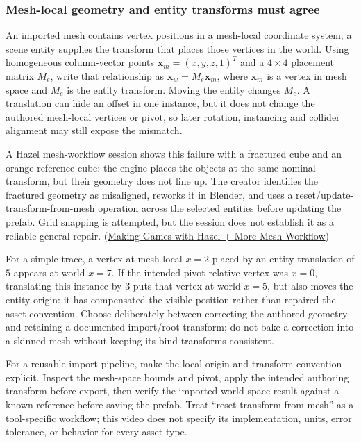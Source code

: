 \subsubsection{Mesh-local geometry and entity transforms must agree}\label{06-engine-ii-ch032-mesh-local-geometry-and-entity-transforms-must-agree}

An imported mesh contains vertex positions in a mesh-local coordinate system; a scene entity supplies the transform that places those vertices in the world. Using homogeneous column-vector points \(\mathbf{x}_m=(x,y,z,1)^T\) and a \(4\times4\) placement matrix \(M_e\), write that relationship as \(\mathbf{x}_w = M_e\mathbf{x}_m\), where \(\mathbf{x}_m\) is a vertex in mesh space and \(M_e\) is the entity transform. Moving the entity changes \(M_e\). A translation can hide an offset in one instance, but it does not change the authored mesh-local vertices or pivot, so later rotation, instancing and collider alignment may still expose the mismatch.

A Hazel mesh-workflow session shows this failure with a fractured cube and an orange reference cube: the engine places the objects at the same nominal transform, but their geometry does not line up. The creator identifies the fractured geometry as misaligned, reworks it in Blender, and uses a reset/update-transform-from-mesh operation across the selected entities before updating the prefab. Grid snapping is attempted, but the session does not establish it as a reliable general repair. (\href{https://www.youtube.com/watch?v=GjqDjvNssOM}{Making Games with Hazel + More Mesh Workflow})

For a simple trace, a vertex at mesh-local \(x=2\) placed by an entity translation of \(5\) appears at world \(x=7\). If the intended pivot-relative vertex was \(x=0\), translating this instance by \(3\) puts that vertex at world \(x=5\), but also moves the entity origin: it has compensated the visible position rather than repaired the asset convention. Choose deliberately between correcting the authored geometry and retaining a documented import/root transform; do not bake a correction into a skinned mesh without keeping its bind transforms consistent.

For a reusable import pipeline, make the local origin and transform convention explicit. Inspect the mesh-space bounds and pivot, apply the intended authoring transform before export, then verify the imported world-space result against a known reference before saving the prefab. Treat ``reset transform from mesh'' as a tool-specific workflow; this video does not specify its implementation, units, error tolerance, or behavior for every asset type.

